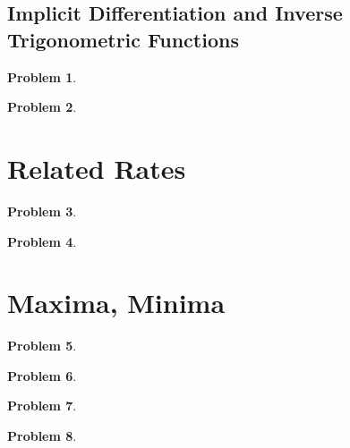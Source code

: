 \documentclass{article}
\newtheorem{problem}{Problem}
\begin{document}
\subsection{Implicit Differentiation and Inverse Trigonometric Functions}
\begin{problem}

\end{problem}
\begin{problem}

\end{problem}

\section{Related Rates}
\begin{problem}

\end{problem}

\begin{problem}

\end{problem}




\section{Maxima, Minima}


\begin{problem}

\end{problem}

\begin{problem}

\end{problem}

\begin{problem}

\end{problem}

\begin{problem}

\end{problem}

\end{document}
